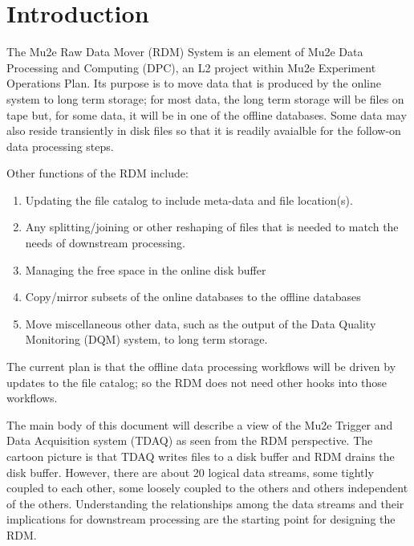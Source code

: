\chapter{Introduction}

\label{ch:intro}

The Mu2e Raw Data Mover (RDM) System is an element of Mu2e Data Processing
and Computing (DPC), an L2 project within Mu2e Experiment Operations Plan.
Its purpose is to move data
that is produced by the online system to long term storage;
for most data, the long term storage will be files on tape
but, for some data, it will be in one of the offline databases.
Some data may also reside transiently in disk files so that
it is readily avaialble for the follow-on data processing steps.

Other functions of the RDM include:
\begin{enumerate}
\item Updating the file catalog to include meta-data and file location(s).
\item Any splitting/joining or other reshaping of files that is needed to match the needs of downstream processing.
\item Managing the free space in the online disk buffer
\item Copy/mirror subsets of the online databases to the offline databases
\item Move miscellaneous other data, such as the output of the Data Quality Monitoring (DQM) system, to long term storage.
\end{enumerate}

The current plan is that the offline data processing workflows will be driven by updates to the file catalog;
so the RDM does not need other hooks into those workflows.



The main body of this document will describe a view of the
Mu2e Trigger and Data Acquisition system (TDAQ) as seen from the RDM perspective.
The cartoon picture is that TDAQ writes files to a disk buffer and RDM drains the disk buffer.
However, there are about 20 logical data streams, some tightly coupled to each
other, some loosely coupled to the others and others independent of the others.
Understanding the relationships among the data streams and their implications
for downstream processing are the starting point for designing the RDM.

